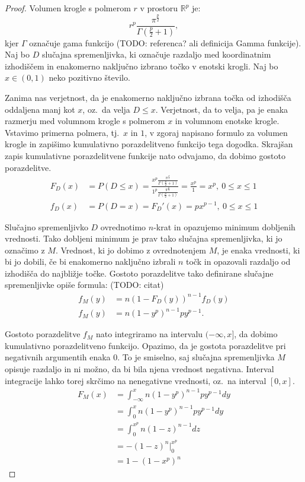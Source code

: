 \documentclass[12pt,a4paper,twoside]{article}
\theoremstyle{definition} %
\theoremstyle{plain} %
\numberwithin{equation}{section}  %
\begin{document}
\begin{proof}

Volumen krogle s polmerom $r$ v prostoru $\mathbb{R}^p$ je: %
$$
r^p \frac{\pi^{\frac{p}{2}}}{\Gamma (\frac{p}{2}+1)},
$$
kjer $\Gamma$ označuje gama funkcijo (TODO: referenca? ali definicija Gamma funkcije). 
Naj bo $D$ slučajna spremenljivka, 
ki označuje razdaljo med koordinatnim izhodiščem in enakomerno naključno izbrano točko v enotski krogli. 
Naj bo $x \in (0,1)$ neko pozitivno število. 

Zanima nas verjetnost, da je enakomerno naključno izbrana točka od izhodišča oddaljena manj kot $x$, oz.~da velja $D \leq x$. 
Verjetnost, da to velja, pa je enaka razmerju med volumnom krogle s polmerom $x$ in volumnom enotske krogle. 
Vstavimo primerna polmera, tj.~$x$ in $1$, v zgoraj napisano formulo za volumen krogle in zapišimo kumulativno porazdelitveno funkcijo tega dogodka. 
Skrajšan zapis kumulativne porazdelitvene funkcije nato odvajamo, da dobimo gostoto porazdelitve.
\begin{align}
F_D(x) & = P(D \leq x) = \frac{x^p \frac{\pi^{\frac{p}{2}}}{\Gamma (\frac{p}{2}+1)}}{1^p \frac{\pi^{\frac{p}{2}}}{\Gamma (\frac{p}{2}+1)}} = \frac{x^p}{1} = x^p,\  0 \leq x \leq 1 \\
f_D(x) & = P(D = x) = F_D '(x) = p x^{p-1},\  0 \leq x \leq 1
\end{align}

Slučajno spremenljivko $D$ ovrednotimo $n$-krat in opazujemo minimum dobljenih vrednosti. 
Tako dobljeni minimum je prav tako slučajna spremenljivka, ki jo označimo z $M$. 
Vrednost, ki jo dobimo z ovrednotenjem $M$, je enaka vrednosti, 
ki bi jo dobili, če bi enakomerno naključno izbrali $n$ točk in opazovali razdaljo od izhodišča do najbližje točke. 
Gostoto porazdelitve tako definirane slučajne spremenljivke opiše formula: (TODO: citat) %
\begin{align*}
f_M(y) & = n(1 - F_D(y))^{n-1} f_D(y) \\
f_M(y) & = n(1 - y^p)^{n-1} p y^{p-1}.
\end{align*}

Gostoto porazdelitve $f_M$ nato integriramo na intervalu $(-\infty,x]$, da dobimo kumulativno porazdelitveno funkcijo. 
Opazimo, da je gostota porazdelitve pri negativnih argumentih enaka $0$. 
To je smiselno, saj slučajna spremenljivka $M$ opisuje razdaljo in ni možno, da bi bila njena vrednost negativna. 
Interval integracije lahko torej skrčimo na nenegativne vrednosti, oz.~na interval $[0,x]$.
\begin{align*}
F_M(x) & = \int_{-\infty}^x n(1 - y^p)^{n-1} p y^{p-1} dy \\
& = \int_0^x n(1 - y^p)^{n-1} p y^{p-1} dy \\
& = \int_0^{x^p} n(1-z)^{n-1} dz \\
& = -(1 - z)^n \Big|_0^{x^p} \\
& = 1 - (1 - x^p)^n
\end{align*}


\end{proof}
\end{document}
